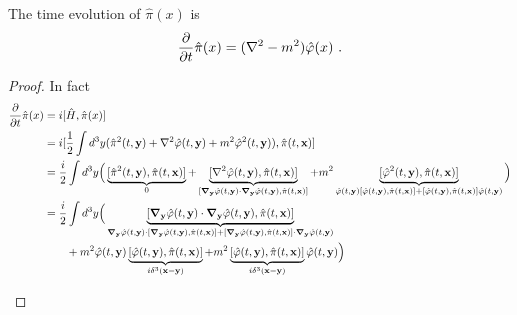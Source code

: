     The time evolution of $\hat \pi (x)$ is 
    \begin{equation*}
        \frac{\partial}{\partial t} \hat \pi (x) = (\nabla^2 - m^2) \hat \varphi (x) ~.
    \end{equation*}
    \begin{proof}
        In fact 
        \begin{equation*}
        \begin{aligned}
            \frac{\partial}{\partial t} \hat \pi (x) & = i [\hat H, \hat \pi (x)] \\ & = i [\frac{1}{2} \int d^3 y (\hat \pi^2 (t, \mathbf y) + \nabla^2 \hat \varphi (t, \mathbf y) + m^2 \hat \varphi^2 (t, \mathbf y)) , \hat \pi (t, \mathbf x)] \\ & = \frac{i}{2} \int d^3 y \Big (\underbrace{[\hat \pi^2 (t, \mathbf y), \hat \pi (t, \mathbf x)]}_0 + \underbrace{[\nabla^2 \hat \varphi (t, \mathbf y), \hat \pi (t, \mathbf x)]}_{[ \boldsymbol \nabla_{\mathbf y} \hat \varphi (t, \mathbf y) \cdot \boldsymbol \nabla_{\mathbf y} \hat \varphi (t, \mathbf y), \hat \pi (t, \mathbf x)]} + m^2 \underbrace{[\hat \varphi^2 (t, \mathbf y), \hat \pi (t, \mathbf x)]}_{\hat \varphi (t, \mathbf y) [\hat \varphi (t, \mathbf y), \hat \pi (t, \mathbf x)] + [\hat \varphi (t, \mathbf y), \hat \pi (t, \mathbf x)] \hat \varphi (t, \mathbf y)} \Big ) \\ & = \frac{i}{2} \int d^3 y \Big (\underbrace{[\boldsymbol \nabla_{\mathbf y} \hat \varphi (t, \mathbf y) \cdot \boldsymbol \nabla_{\mathbf y} \hat \varphi (t, \mathbf y), \hat \pi (t, \mathbf x)]}_{\boldsymbol \nabla_{\mathbf y} \hat \varphi (t, \mathbf y) \cdot [\boldsymbol \nabla_{\mathbf y} \hat \varphi (t, \mathbf y), \hat \pi (t, \mathbf x)] + [\boldsymbol \nabla_{\mathbf y} \hat \varphi (t, \mathbf y), \hat \pi (t, \mathbf x)] \cdot \boldsymbol \nabla_{\mathbf y} \hat \varphi (t, \mathbf y)} \\ & \qquad + m^2 \hat \varphi (t, \mathbf y) \underbrace{[\hat \varphi (t, \mathbf y), \hat \pi (t, \mathbf x)]}_{i \delta^3 (\mathbf x - \mathbf y)} + m^2 \underbrace{[\hat \varphi (t, \mathbf y), \hat \pi (t, \mathbf x)]}_{i \delta^3 (\mathbf x - \mathbf y)} \hat 
            \varphi (t, \mathbf y) \Big ) 
        \end{aligned}    
        \end{equation*}
        \begin{equation*}
        \begin{aligned}

\end{aligned}
\end{equation*}
\end{proof}
